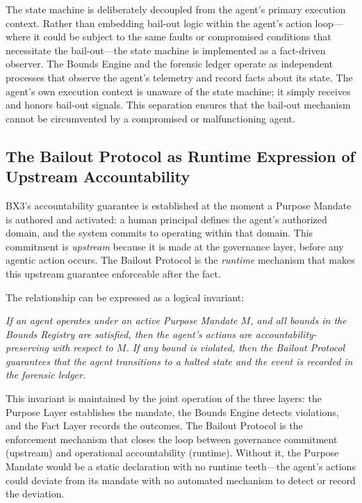 The state machine is deliberately decoupled from the agent's primary execution context. Rather than embedding bail-out logic within the agent's action loop—where it could be subject to the same faults or compromised conditions that necessitate the bail-out—the state machine is implemented as a fact-driven observer. The Bounds Engine and the forensic ledger operate as independent processes that observe the agent's telemetry and record facts about its state. The agent's own execution context is unaware of the state machine; it simply receives and honors bail-out signals. This separation ensures that the bail-out mechanism cannot be circumvented by a compromised or malfunctioning agent.

\subsection{The Bailout Protocol as Runtime Expression of Upstream Accountability}
\label{subsection:bailout-upstream-accountability}

BX3's accountability guarantee is established at the moment a Purpose Mandate is authored and activated: a human principal defines the agent's authorized domain, and the system commits to operating within that domain. This commitment is \textit{upstream} because it is made at the governance layer, before any agentic action occurs. The Bailout Protocol is the \textit{runtime} mechanism that makes this upstream guarantee enforceable after the fact.

The relationship can be expressed as a logical invariant:

\begin{center}
\textit{If an agent operates under an active Purpose Mandate $M$, and all bounds in the Bounds Registry are satisfied, then the agent's actions are accountability-preserving with respect to $M$. If any bound is violated, then the Bailout Protocol guarantees that the agent transitions to a halted state and the event is recorded in the forensic ledger.}
\end{center}

This invariant is maintained by the joint operation of the three layers: the Purpose Layer establishes the mandate, the Bounds Engine detects violations, and the Fact Layer records the outcomes. The Bailout Protocol is the enforcement mechanism that closes the loop between governance commitment (upstream) and operational accountability (runtime). Without it, the Purpose Mandate would be a static declaration with no runtime teeth—the agent's actions could deviate from its mandate with no automated mechanism to detect or record the deviation.

